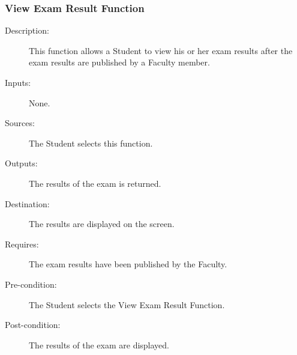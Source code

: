 \subsubsection{\large View Exam Result Function} 
\begin{boxed} %
\begin{description}
\item[Description:]
   This function allows a Student to view his or her exam results after the exam
   results are published by a Faculty member.
\item[Inputs:]
   None.
\item[Sources:]
   The Student selects this function.
\item[Outputs:]
   The results of the exam is returned.
\item[Destination:]
   The results are displayed on the screen.
\item[Requires:]
   The exam results have been published by the Faculty.
\item[Pre-condition:]
   The Student selects the View Exam Result Function.
\item[Post-condition:]
   The results of the exam are displayed.
\end{description}
\end{boxed} %
